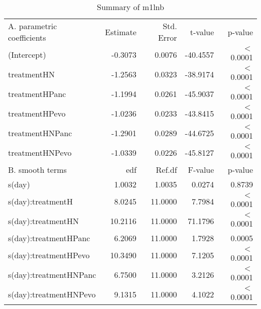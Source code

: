 \begin{table}[ht]
\centering
\begin{tabular}{lrrrr}
   \hline
A. parametric coefficients & Estimate & Std. Error & t-value & p-value \\ 
  (Intercept) & -0.3073 & 0.0076 & -40.4557 & $<$ 0.0001 \\ 
  treatmentHN & -1.2563 & 0.0323 & -38.9174 & $<$ 0.0001 \\ 
  treatmentHPanc & -1.1994 & 0.0261 & -45.9037 & $<$ 0.0001 \\ 
  treatmentHPevo & -1.0236 & 0.0233 & -43.8415 & $<$ 0.0001 \\ 
  treatmentHNPanc & -1.2901 & 0.0289 & -44.6725 & $<$ 0.0001 \\ 
  treatmentHNPevo & -1.0339 & 0.0226 & -45.8127 & $<$ 0.0001 \\ 
   \hline
B. smooth terms & edf & Ref.df & F-value & p-value \\ 
  s(day) & 1.0032 & 1.0035 & 0.0274 & 0.8739 \\ 
  s(day):treatmentH & 8.0245 & 11.0000 & 7.7984 & $<$ 0.0001 \\ 
  s(day):treatmentHN & 10.2116 & 11.0000 & 71.1796 & $<$ 0.0001 \\ 
  s(day):treatmentHPanc & 6.2069 & 11.0000 & 1.7928 & 0.0005 \\ 
  s(day):treatmentHPevo & 10.3490 & 11.0000 & 7.1205 & $<$ 0.0001 \\ 
  s(day):treatmentHNPanc & 6.7500 & 11.0000 & 3.2126 & $<$ 0.0001 \\ 
  s(day):treatmentHNPevo & 9.1315 & 11.0000 & 4.1022 & $<$ 0.0001 \\ 
   \hline
\end{tabular}
\caption{Summary of m1lnb} 
\label{tab.gam}
\end{table}

